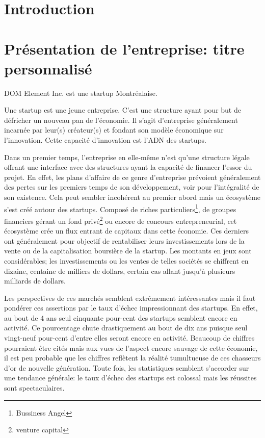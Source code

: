 \documentclass[11pt, a4paper ]{article}
\let\stdsection\section
\renewcommand\section{\newpage\stdsection}
\begin{document}
\begin{spacing}{1.5}
	\section{Introduction} %



	\section{Présentation de l'entreprise: titre personnalisé} %

DOM Element Inc. est une startup Montréalaise.

Une startup\cite{theseStartup} est une jeune entreprise. C'est une structure ayant pour but de défricher un nouveau pan de l'économie. Il s'agit d'entreprise généralement incarnée par leur(s) créateur(s) et fondant son modèle économique sur l'innovation. Cette capacité d'innovation est l'ADN des startups.

Dans un premier temps, l'entreprise en elle-même n'est qu'une structure légale offrant une interface avec des structures ayant la capacité de financer l’essor du projet. En effet, les plans d'affaire de ce genre d'entreprise prévoient généralement des pertes sur les premiers temps de son développement, voir pour l'intégralité de son existence. Cela peut sembler incohérent au premier abord mais un écosystème s'est créé autour des startups. Composé de riches particuliers\footnote{Bussiness Angel}, de groupes financiers gérant un fond privé\footnote{venture capital} ou encore de concours entrepreneurial, cet écosystème crée un flux entrant de capitaux dans cette économie. Ces derniers ont généralement pour objectif de rentabiliser leurs investissements lors de la vente ou de la capitalisation boursière de la startup. Les montants en jeux sont considérables; les investissements ou les ventes de telles sociétés se chiffrent en dizaine, centaine de milliers de dollars, certain cas allant jusqu'à plusieurs milliards de dollars.

Les perspectives de ces marchés semblent extrêmement intéressantes mais il faut pondérer ces assertions par le taux d'échec impressionnant des startups. En effet, au bout de 4 ans seul cinquante pour-cent des startups semblent encore en activité. Ce pourcentage chute drastiquement au bout de dix ans puisque seul vingt-neuf pour-cent d'entre elles seront encore en activité.
Beaucoup de chiffres pourraient être cités mais aux vues de l'aspect encore sauvage de cette économie, il est peu probable que les chiffres reflètent la réalité tumultueuse de ces chasseurs d'or de nouvelle génération.
Toute fois, les statistiques semblent s'accorder sur une tendance générale: le taux d'échec des startups est colossal mais les réussites sont spectaculaires.


\end{spacing}
\end{document}
